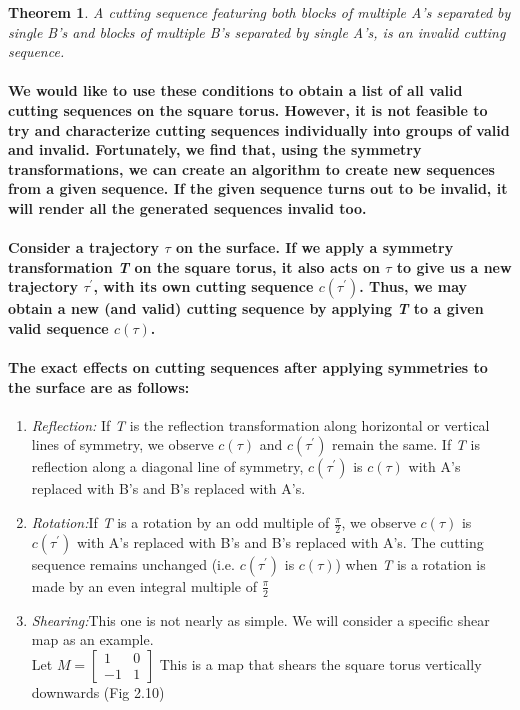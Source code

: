 \documentclass{report}
\newtheorem{theorem}{Theorem}[chapter]
\begin{document}
\begin{theorem}
A cutting sequence featuring both blocks of multiple A’s separated by single B’s and blocks of multiple B’s separated by single A’s, is an invalid cutting sequence.
\end{theorem}

\paragraph{We would like to use these conditions to obtain a list of all valid cutting sequences on the square torus. However, it is not feasible to try and characterize cutting sequences individually into groups of valid and invalid. Fortunately, we find that, using the symmetry transformations, we can create an algorithm to create new sequences from a given sequence. If the given sequence turns out to be invalid, it will render all the generated sequences invalid too.}

\paragraph{Consider a trajectory $\tau$ on the surface. If we apply a symmetry transformation \textit{T} on the square torus, it also acts on $\tau$ to give us a new trajectory $\tau^{'}$, with its own cutting sequence $c(\tau^{'})$. Thus, we may obtain a new (and valid) cutting sequence by applying \textit{T} to a given valid sequence  $c(\tau)$.}

\paragraph{The exact effects on cutting sequences after applying symmetries to the surface are as follows:}

\begin{enumerate}
\item  {\emph{Reflection:} If \textit{T} is the reflection transformation along horizontal or vertical lines of symmetry, we observe $c(\tau)$ and $c(\tau^{'})$ remain the same. If \textit{T} is reflection along a diagonal line of symmetry, $c(\tau^{'})$ is $c(\tau)$ with A’s replaced with B’s and B’s replaced with A’s.}
\item  {\emph{Rotation:}If \textit{T} is a rotation by an odd multiple of $\frac{\pi}{2}$, we observe $c(\tau)$ is $c(\tau^{'})$ with A’s replaced with B’s and B’s replaced with A’s. The cutting sequence remains unchanged (i.e. $c(\tau^{'})$ is $c(\tau)$) when \textit{T} is a rotation is made by an even integral multiple of $\frac{\pi}{2}$}
\item  {\emph{Shearing:}This one is not nearly as simple. We will consider a specific shear map as an example. \\
Let $M = \begin{bmatrix} 1&0\\-1&1 \end{bmatrix}$ This is a map that shears the square torus vertically downwards (Fig 2.10) }
\end{enumerate}
\end{document}
